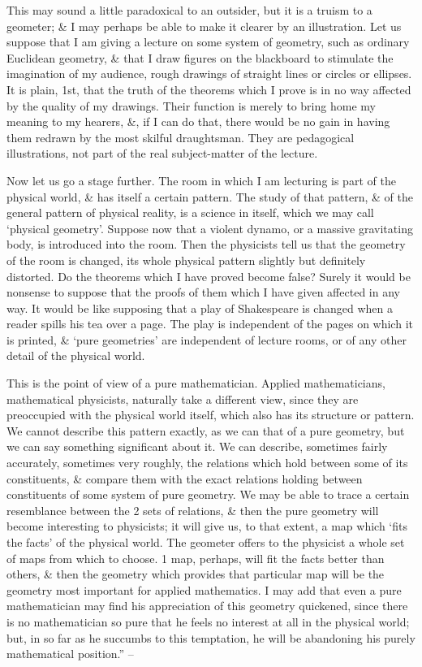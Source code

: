 \documentclass{article}
\numberwithin{equation}{section}
\begin{document}
This may sound a little paradoxical to an outsider, but it is a truism to a geometer; \& I may perhaps be able to make it clearer by an illustration. Let us suppose that I am giving a lecture on some system of geometry, such as ordinary Euclidean geometry, \& that I draw figures on the blackboard to stimulate the imagination of my audience, rough drawings of straight lines or circles or ellipses. It is plain, 1st, that the truth of the theorems which I prove is in no way affected by the quality of my drawings. Their function is merely to bring home my meaning to my hearers, \&, if I can do that, there would be no gain in having them redrawn by the most skilful draughtsman. They are pedagogical illustrations, not part of the real subject-matter of the lecture.

Now let us go a stage further. The room in which I am lecturing is part of the physical world, \& has itself a certain pattern. The study of that pattern, \& of the general pattern of physical reality, is a science in itself, which we may call `physical geometry'. Suppose now that a violent dynamo, or a massive gravitating body, is introduced into the room. Then the physicists tell us that the geometry of the room is changed, its whole physical pattern slightly but definitely distorted. Do the theorems which I have proved become false? Surely it would be nonsense to suppose that the proofs of them which I have given affected in any way. It would be like supposing that a play of Shakespeare is changed when a reader spills his tea over a page. The play is independent of the pages on which it is printed, \& `pure geometries' are independent of lecture rooms, or of any other detail of the physical world.

This is the point of view of a pure mathematician. Applied mathematicians, mathematical physicists, naturally take a different view, since they are preoccupied with the physical world itself, which also has its structure or pattern. We cannot describe this pattern exactly, as we can that of a pure geometry, but we can say something significant about it. We can describe, sometimes fairly accurately, sometimes very roughly, the relations which hold between some of its constituents, \& compare them with the exact relations holding between constituents of some system of pure geometry. We may be able to trace a certain resemblance between the 2 sets of relations, \& then the pure geometry will become interesting to physicists; it will give us, to that extent, a map which `fits the facts' of the physical world. The geometer offers to the physicist a whole set of maps from which to choose. 1 map, perhaps, will fit the facts better than others, \& then the geometry which provides that particular map will be the geometry most important for applied mathematics. I may add that even a pure mathematician may find his appreciation of this geometry quickened, since there is no mathematician so pure that he feels no interest at all in the physical world; but, in so far as he succumbs to this temptation, he will be abandoning his purely mathematical position.'' -- \cite[pp. 124--128]{Hardy1992}
\end{document}
